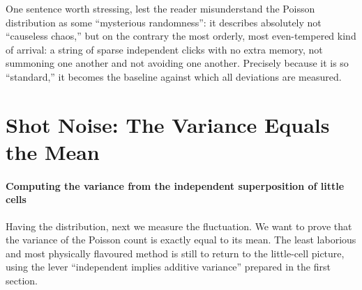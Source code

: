 One sentence worth stressing, lest the reader misunderstand the Poisson distribution as some ``mysterious randomness'': it describes absolutely not ``causeless chaos,'' but on the contrary the most orderly, most even-tempered kind of arrival: a string of sparse independent clicks with no extra memory, not summoning one another and not avoiding one another. Precisely because it is so ``standard,'' it becomes the baseline against which all deviations are measured.

\section{Shot Noise: The Variance Equals the Mean}
\label{sec:e03-shotnoise}

\paragraph{Computing the variance from the independent superposition of little cells}

Having the distribution, next we measure the fluctuation. We want to prove that the variance of the Poisson count is exactly equal to its mean. The least laborious and most physically flavoured method is still to return to the little-cell picture, using the lever ``independent implies additive variance'' prepared in the first section.

